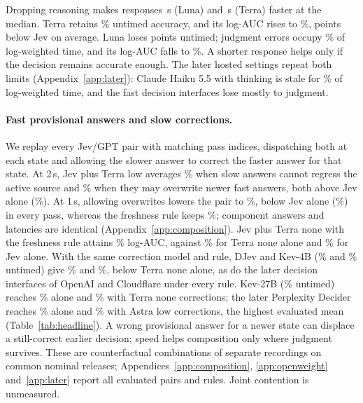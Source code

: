 \documentclass[11pt]{article}
\begin{document}
Dropping reasoning makes responses \LunaNoneLatencySavingSec\,s (Luna) and \TerraNoneLatencySavingSec\,s (Terra) faster at the median.
Terra retains \TerraNoneUntimed\% untimed accuracy, and its log-AUC rises to \TerraNoneAuc\%, \JevMinusTerraNoneAuc{} points below Jev on average.
Luna loses \LunaMinusLunaNoneUntimed{} points untimed; judgment errors occupy \LunaNoneAucJudgment\% of log-weighted time, and its log-AUC falls to \LunaNoneAuc\%.
A shorter response helps only if the decision remains accurate enough.
The later hosted settings repeat both limits (Appendix~\ref{app:later}): Claude Haiku 5.5 with thinking is stale for \LaterHaikuStale\% of log-weighted time, and the fast decision interfaces lose mostly to judgment.

\paragraph{Fast provisional answers and slow corrections.}
We replay every Jev/GPT pair with matching pass indices, dispatching both at each state and allowing the slower answer to correct the faster answer for that state.
At 2\,s, Jev plus Terra low averages \TrajTerraFreshestTwo\% when slow answers cannot regress the active source and \TrajTerraArrivalTwo\% when they may overwrite newer fast answers, both above Jev alone (\TrajJevTwo\%). At 1\,s, allowing overwrites lowers the pair to \TrajTerraArrivalOne\%, below Jev alone (\TrajJevOne\%) in every pass, whereas the freshness rule keeps \TrajTerraFreshestOne\%; component answers and latencies are identical (Appendix~\ref{app:composition}).
Jev plus Terra none with the freshness rule attains \OwJevTerraNoneAuc\% log-AUC, against \OwTerraNoneAuc\% for Terra none alone and \HeadlineJevAuc\% for Jev alone.
With the same correction model and rule, DJev and Kev-4B (\OwDJevUntimed\% and \OwKevUntimed\% untimed) give \OwDJevFreshestAuc\% and \OwKevFreshestAuc\%, below Terra none alone, as do the later decision interfaces of OpenAI and Cloudflare under every rule.
Kev-27B (\OwKevTwentySevenUntimed\% untimed) reaches \OwKevTwentySevenAuc\% alone and \OwKevTwentySevenFreshestAuc\% with Terra none corrections; the later Perplexity Decider reaches \LaterPerplexityAuc\% alone and \LaterBestAuc\% with Astra low corrections, the highest evaluated mean (Table~\ref{tab:headline}).
A wrong provisional answer for a newer state can displace a still-correct earlier decision; speed helps composition only where judgment survives.
These are counterfactual combinations of separate recordings on common nominal releases; Appendices~\ref{app:composition}, \ref{app:openweight} and~\ref{app:later} report all evaluated pairs and rules. Joint contention is unmeasured.
\end{document}
